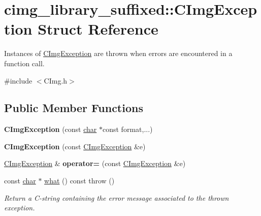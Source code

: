 \hypertarget{structcimg__library__suffixed_1_1CImgException}{}\section{cimg\+\_\+library\+\_\+suffixed\+:\+:C\+Img\+Exception Struct Reference}
\label{structcimg__library__suffixed_1_1CImgException}


Instances of {\ttfamily \hyperlink{structcimg__library__suffixed_1_1CImgException}{C\+Img\+Exception}} are thrown when errors are encountered in a  function call.  




{\ttfamily \#include $<$C\+Img.\+h$>$}

\subsection*{Public Member Functions}
\begin{DoxyCompactItemize}
\item 
\mbox{\label{structcimg__library__suffixed_1_1CImgException_aeb349b6446eb9bd5ca8a6c0106e69c34}} 
{\bfseries C\+Img\+Exception} (const \hyperlink{classchar}{char} $\ast$const format,...)
\item 
\mbox{\label{structcimg__library__suffixed_1_1CImgException_ac8463f57e62e505d097d73008f922206}} 
{\bfseries C\+Img\+Exception} (const \hyperlink{structcimg__library__suffixed_1_1CImgException}{C\+Img\+Exception} \&e)
\item 
\mbox{\label{structcimg__library__suffixed_1_1CImgException_aefe4482f16f1b615abe8b9407ec54a01}} 
\hyperlink{structcimg__library__suffixed_1_1CImgException}{C\+Img\+Exception} \& {\bfseries operator=} (const \hyperlink{structcimg__library__suffixed_1_1CImgException}{C\+Img\+Exception} \&e)
\item 
\mbox{\label{structcimg__library__suffixed_1_1CImgException_a7ce3499518ace836d2b11ebafb078714}} 
const \hyperlink{classchar}{char} $\ast$ \hyperlink{structcimg__library__suffixed_1_1CImgException_a7ce3499518ace836d2b11ebafb078714}{what} () const  throw ()
\begin{DoxyCompactList}\small\item\em Return a C-\/string containing the error message associated to the thrown exception. \end{DoxyCompactList}\end{DoxyCompactItemize}

